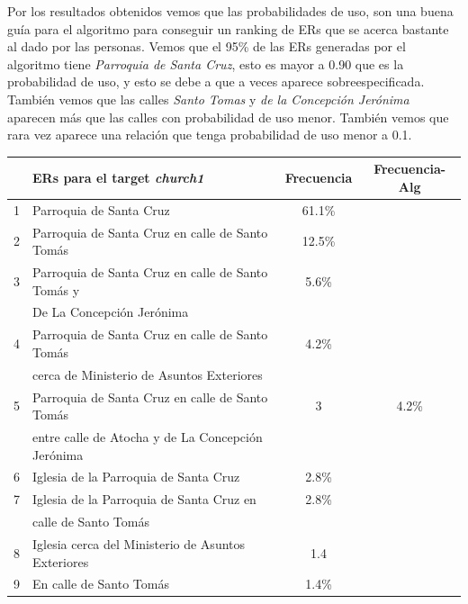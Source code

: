 Por los resultados obtenidos vemos que las probabilidades de uso, son una buena gu\'ia para el algoritmo para conseguir un ranking de ERs que se acerca bastante al dado por las personas. Vemos que el 95\% de las ERs generadas por el algoritmo tiene {\it Parroquia de Santa Cruz}, esto es mayor a 0.90 que es la probabilidad de uso, y esto se debe a que a veces aparece sobreespecificada. Tambi\'en vemos que las calles {\it Santo Tomas} y {\it de la Concepci\'on Jer\'onima} aparecen m\'as que las calles con probabilidad de uso menor. Tambi\'en vemos que rara vez aparece una relaci\'on que tenga probabilidad de uso menor a 0.1.     


\begin{table}[H]
{\footnotesize
\begin{center}
\begin{tabular}{|l|l|c|c|}
\hline
&ERs para el target {\it church1} 					       &  Frecuencia & Frecuencia-Alg \\ \hline \hline
1&Parroquia de Santa Cruz        						   &	61.1\%  &   \\ \hline
2&Parroquia de Santa Cruz en calle de Santo Tom\'as        &    12.5\%	&   \\ \hline
3&Parroquia de Santa Cruz en calle de Santo Tom\'as y      &    5.6\%   & \\
&De La Concepci\'on Jer\'onima                             &            &  \\ \hline
4&Parroquia de Santa Cruz en calle de Santo Tom\'as        &     4.2\%  &\\
&cerca de Ministerio de Asuntos Exteriores                 &            &\\  \hline
5&Parroquia de Santa Cruz en calle de Santo Tom\'as        &	3       &	4.2\%	 \\
&entre calle de Atocha y de La Concepci\'on Jer\'onima     &	        &			 \\  \hline
6&Iglesia de la Parroquia de Santa Cruz			           &	2.8\%	&\\  \hline
7&Iglesia de la Parroquia de Santa Cruz	en      	       &	2.8\%	&\\  
&calle de Santo Tom\'as									   &	    	&	    \\ \hline
8&Iglesia cerca del Ministerio de Asuntos Exteriores       &	1.4	    &\\  \hline
9&En calle de Santo Tom\'as                                &   1.4\%    &\\  \hline


\end{tabular}
\end{center}}
\end{table}
